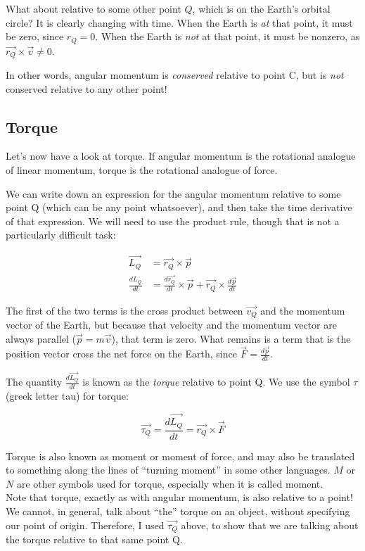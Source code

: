 \documentclass[12pt,a4paper]{report}
\begin{document}
What about relative to some other point $Q$, which is on the Earth's orbital circle? It is clearly changing with time. When the Earth is \emph{at} that point, it must be zero, since $r_Q = 0$. When the Earth is \emph{not} at that point, it must be nonzero, as $\vec{r_Q} \times \vec{v} \neq 0$.

In other words, angular momentum is \emph{conserved} relative to point C, but is \emph{not} conserved relative to any other point!

\subsection{Torque}

Let's now have a look at torque. If angular momentum is the rotational analogue of linear momentum, torque is the rotational analogue of force.

We can write down an expression for the angular momentum relative to some point Q (which can be any point whatsoever), and then take the time derivative of that expression. We will need to use the product rule, though that is not a particularly difficult task:

\begin{align}
\vec{L_Q} &= \vec{r_Q} \times \vec{p}\\
\frac{dL_Q}{dt} &= \frac{d\vec{r_Q}}{dt} \times \vec{p} + \vec{r_Q} \times \frac{d\vec{p}}{dt}
\end{align}

The first of the two terms is the cross product between $\vec{v_Q}$ and the momentum vector of the Earth, but because that velocity and the momentum vector are always parallel ($\vec{p} = m \vec{v}$), that term is zero. What remains is a term that is the position vector cross the net force on the Earth, since $\displaystyle \vec{F} = \frac{d\vec{p}}{dt}$.

The quantity $\displaystyle \frac{d\vec{L_Q}}{dt}$ is known as the \emph{torque} relative to point Q. We use the symbol $\tau$ (greek letter tau) for torque:

\begin{equation}
\vec{\tau_Q} = \frac{d\vec{L_Q}}{dt} = \vec{r_Q} \times \vec{F}
\end{equation}

Torque is also known as moment or moment of force, and may also be translated to something along the lines of ``turning moment'' in some other languages. $M$ or $N$ are other symbols used for torque, especially when it is called moment.\\
Note that torque, exactly as with angular momentum, is also relative to a point! We cannot, in general, talk about ``the'' torque on an object, without specifying our point of origin. Therefore, I used $\vec{\tau_Q}$ above, to show that we are talking about the torque relative to that same point Q.
\end{document}
